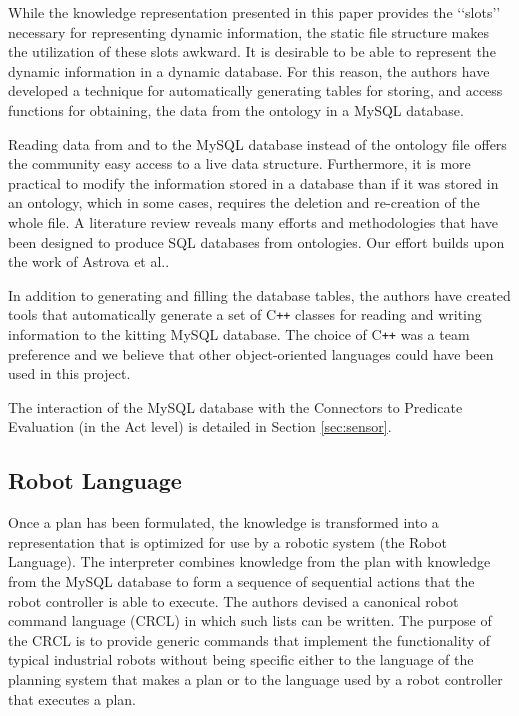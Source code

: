 While the knowledge representation presented in this paper provides the \lq\lq{}slots\rq\rq{} necessary for representing dynamic information, the
static file structure makes the utilization of these slots awkward. It is desirable to be able to represent the dynamic information in a dynamic database. For this reason, the authors have developed a technique for automatically generating tables for storing,  and access functions for obtaining, the data from the ontology in a MySQL database.

Reading data from and to the MySQL database instead of the ontology file offers the community easy access to a live data structure. Furthermore, it is more practical to modify the information stored in a database than if it was stored in an ontology, which in some cases, requires the deletion and re-creation of the whole file. A literature review reveals many efforts and methodologies that have been designed to produce SQL databases from ontologies. Our effort builds upon the work of Astrova et al.\cite{Astrova2007}. 

In addition to generating and filling the database tables, the authors have created tools that automatically generate a set of C{}\texttt{++} classes for reading and writing
information to the kitting MySQL database. The choice of C{}\texttt{++} was a team preference and we believe that other object-oriented languages could have been used in this project.

The interaction of the MySQL database with the Connectors to Predicate Evaluation (in the Act level) is detailed in Section \ref{sec:sensor}.

\subsection{Robot Language}
Once a plan has been formulated, the knowledge is transformed into a
representation that is optimized for use by a robotic system (the Robot
Language). The interpreter combines knowledge from the plan with knowledge
from the MySQL database to form a sequence of sequential actions that the
robot controller is able to execute. The authors devised a canonical robot
command language (CRCL) in which such lists can be written. The purpose of
the CRCL is to provide generic commands that implement the functionality of
typical industrial robots without being specific either to the language of
the planning system that makes a plan or to the language used by a robot
controller that executes a plan.